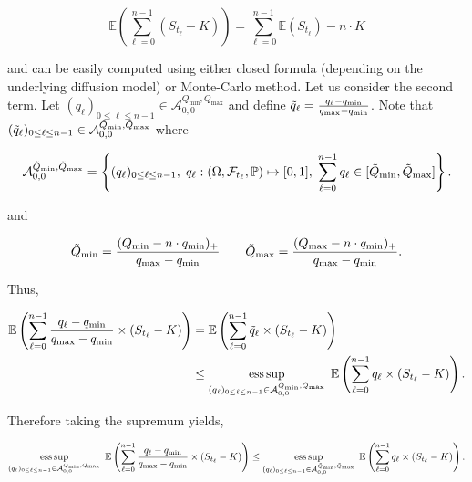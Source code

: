 \documentclass{article}
\DeclareMathOperator*{\esssup}{ess\,sup}
\numberwithin{equation}{section}
\begin{document}
$$\mathbb{E}\left(\sum_{\ell=0}^{n-1} (S_{t_\ell} - K) \right) = \sum_{\ell=0}^{n-1}\mathbb{E}\left(S_{t_\ell} \right) - n \cdot K$$

\noindent
and can be easily computed using either closed formula (depending on the underlying diffusion model) or Monte-Carlo method. Let us consider the second term. Let $(q_{\ell})_{0 \le \ell \le n-1} \in \mathcal{A}_{0, 0}^{Q_{\min}, Q_{\max}}$ and define $\Tilde{q}_{\ell} = \frac{q_{\ell} - q_{\min}}{q_{\max} - q_{\min}}$. Note that $(\Tilde{q}_{\ell})_{0 \le \ell \le n-1} \in \mathcal{A}_{0, 0}^{\Tilde{Q}_{\min}, \Tilde{Q}_{\max}}$ where


$$\mathcal{A}_{0, 0}^{\Tilde{Q}_{\min}, \Tilde{Q}_{\max}} = \left\{(q_{\ell})_{0 \le \ell \le n-1}, \hspace{0.1cm} q_{\ell} : (\Omega, \mathcal{F}_{t_\ell}, \mathbb{P}) \mapsto [0, 1], \hspace{0.1cm} \sum_{\ell = 0}^{n-1} q_{\ell} \in [\Tilde{Q}_{\min}, \Tilde{Q}_{\max}] \right\}.$$

\noindent
and

$$\Tilde{Q}_{\min} = \frac{(Q_{\min} - n \cdot q_{\min})_{+}}{q_{\max} - q_{\min}} \hspace{0.7cm} \Tilde{Q}_{\max} = \frac{(Q_{\max} - n \cdot q_{\min})_{+}}{q_{\max} - q_{\min}}.$$

\noindent
Thus,

\begin{align*}
    \mathbb{E}\left(\sum_{\ell=0}^{n-1} \frac{q_{\ell} - q_{\min}}{q_{\max} - q_{\min}} \times (S_{t_\ell} - K) \right) &= \mathbb{E}\left(\sum_{\ell=0}^{n-1} \Tilde{q}_{\ell} \times (S_{t_\ell} - K) \right)\\
    &\le \esssup_{(q_{\ell})_{0 \le \ell \le n-1} \in \mathcal{A}_{0, 0}^{\Tilde{Q}_{\min}, \Tilde{Q}_{\max}}}\hspace{0.1cm} \mathbb{E}\left(\sum_{\ell=0}^{n-1} q_{\ell} \times (S_{t_\ell} - K) \right).
\end{align*}

\noindent
Therefore taking the supremum yields,

$$\esssup_{(q_{\ell})_{0 \le \ell \le n-1} \in \mathcal{A}_{0, 0}^{Q_{\min}, Q_{\max}}} \hspace{0.1cm} \mathbb{E}\left(\sum_{\ell=0}^{n-1} \frac{q_{\ell} - q_{\min}}{q_{\max} - q_{\min}} \times (S_{t_\ell} - K) \right) \le \esssup_{(q_{\ell})_{0 \le \ell \le n-1} \in \mathcal{A}_{0, 0}^{\Tilde{Q}_{\min}, \Tilde{Q}_{\max}}} \hspace{0.1cm} \mathbb{E}\left(\sum_{\ell=0}^{n-1} q_{\ell} \times (S_{t_\ell} - K) \right).$$
\end{document}
